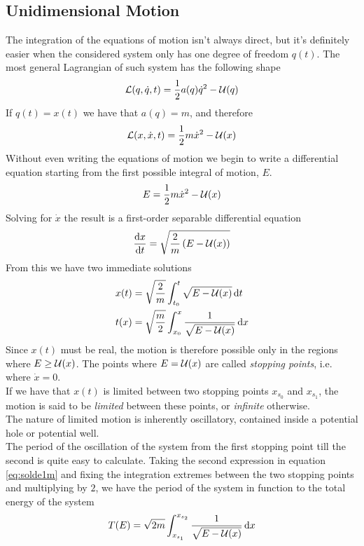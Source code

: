 \documentclass[../admech.tex]{subfiles}
\begin{document}
\subsection{Unidimensional Motion}
The integration of the equations of motion isn't always direct, but it's definitely easier when the considered system only has one degree of freedom $q(t)$. The most general Lagrangian of such system has the following shape
\begin{equation*}
	\mathcal{L}(q,\dot{q},t)=\frac{1}{2}a(q)\dot{q}^2-\mathcal{U}(q)
\end{equation*}
If $q(t)=x(t)$ we have that $a(q)=m$, and therefore
\begin{equation*}
	\mathcal{L}(x,\dot{x},t)=\frac{1}{2}m\dot{x}^2-\mathcal{U}(x)
\end{equation*}
Without even writing the equations of motion we begin to write a differential equation starting from the first possible integral of motion, $E$.
\begin{equation*}
	E=\frac{1}{2}m\dot{x}^2-\mathcal{U}(x)
\end{equation*}
Solving for $\dot{x}$ the result is a first-order separable differential equation
\begin{equation}
	\dv{x}{t}=\sqrt{\frac{2}{m}\left( E-\mathcal{U}(x) \right)}
	\label{eq:fsde1m}
\end{equation}
From this we have two immediate solutions
\begin{equation}
	\begin{aligned}
		x(t)&=\sqrt{\frac{2}{m}}\int_{t_0}^{t}\sqrt{E-\mathcal{U}(x)}\dd{t}\\
		t(x)&=\sqrt{\frac{m}{2}}\int_{x_0}^{x}\frac{1}{\sqrt{E-\mathcal{U}(x)}}\dd{x}
	\end{aligned}
	\label{eq:solde1m}
\end{equation}
Since $x(t)$ must be real, the motion is therefore possible only in the regions where $E\ge\mathcal{U}(x)$. The points where $E=\mathcal{U}(x)$ are called \emph{stopping points}, i.e. where $\dot{x}=0$.\\
If we have that $x(t)$ is limited between two stopping points $x_{s_0}$ and $x_{s_1}$, the motion is said to be \emph{limited} between these points, or \emph{infinite} otherwise.\\
The nature of limited motion is inherently oscillatory, contained inside a potential hole or potential well.\\
The period of the oscillation of the system from the first stopping point till the second is quite easy to calculate. Taking the second expression in equation \eqref{eq:solde1m} and fixing the integration extremes between the two stopping points and multiplying by $2$, we have the period of the system in function to the total energy of the system
\begin{equation}
	T(E)=\sqrt{2m}\int_{x_{s_1}}^{x_{s_2}}\frac{1}{\sqrt{E-\mathcal{U}(x)}}\dd{x}
	\label{eq:periodenergy}
\end{equation}
\end{document}
